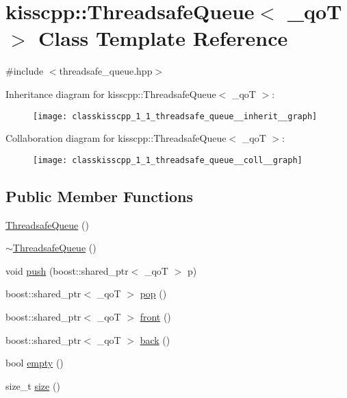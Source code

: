 \hypertarget{classkisscpp_1_1_threadsafe_queue}{\section{kisscpp\-:\-:Threadsafe\-Queue$<$ \-\_\-qo\-T $>$ Class Template Reference}
\label{classkisscpp_1_1_threadsafe_queue}
}


{\ttfamily \#include $<$threadsafe\-\_\-queue.\-hpp$>$}



Inheritance diagram for kisscpp\-:\-:Threadsafe\-Queue$<$ \-\_\-qo\-T $>$\-:\nopagebreak
\begin{figure}[H]
\begin{center}
\leavevmode
\texttt{[image: classkisscpp\_1\_1\_threadsafe\_queue\_\_inherit\_\_graph]}
\end{center}
\end{figure}


Collaboration diagram for kisscpp\-:\-:Threadsafe\-Queue$<$ \-\_\-qo\-T $>$\-:\nopagebreak
\begin{figure}[H]
\begin{center}
\leavevmode
\texttt{[image: classkisscpp\_1\_1\_threadsafe\_queue\_\_coll\_\_graph]}
\end{center}
\end{figure}
\subsection*{Public Member Functions}
\begin{DoxyCompactItemize}
\item 
\hyperlink{classkisscpp_1_1_threadsafe_queue_a77e614d9676f60c19e0eaa4c50f3f804}{Threadsafe\-Queue} ()
\item 
\hyperlink{classkisscpp_1_1_threadsafe_queue_ac561918dd6c95c7334b2e56917a74567}{$\sim$\-Threadsafe\-Queue} ()
\item 
void \hyperlink{classkisscpp_1_1_threadsafe_queue_aaca1e00d06c1eb749f6a293d1ca07a7d}{push} (boost\-::shared\-\_\-ptr$<$ \-\_\-qo\-T $>$ p)
\item 
boost\-::shared\-\_\-ptr$<$ \-\_\-qo\-T $>$ \hyperlink{classkisscpp_1_1_threadsafe_queue_a0bbccaf15a770fd0b3b16b85ed957c8d}{pop} ()
\item 
boost\-::shared\-\_\-ptr$<$ \-\_\-qo\-T $>$ \hyperlink{classkisscpp_1_1_threadsafe_queue_abb61873eafe8958aad8f6bca8f00a4b3}{front} ()
\item 
boost\-::shared\-\_\-ptr$<$ \-\_\-qo\-T $>$ \hyperlink{classkisscpp_1_1_threadsafe_queue_ad6f26dad2d2e9111c8c06f3dbda04c76}{back} ()
\item 
bool \hyperlink{classkisscpp_1_1_threadsafe_queue_a3fa0826aed79b1164a45eb0517248819}{empty} ()
\item 
size\-\_\-t \hyperlink{classkisscpp_1_1_threadsafe_queue_a8c89a9c02a8a05ae2336f27b57502c87}{size} ()
\end{DoxyCompactItemize}


